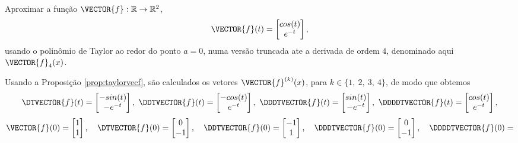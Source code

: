 \begin{example}\label{ex:prop:taylorvecf}
Aproximar a função $\VECTOR{f}:\mathbb{R} \rightarrow \mathbb{R}^{2}$,
\begin{equation}
\VECTOR{f}(t)=
\begin{bmatrix}
cos(t)\\
e^{-t}
\end{bmatrix},
\end{equation}
usando o polinômio de Taylor ao redor do ponto $a=0$,
numa versão truncada ate a derivada de ordem $4$,
denominado aqui $\VECTOR{f}_4(x)$.
\end{example}
\begin{SolutionT}
Usando a Proposição \ref{prop:taylorvecf}, são calculados os vetores $\VECTOR{f}^{(k)}(x)$, para $k\in\{1,~ 2,~ 3,~ 4\}$,
de modo que obtemos
\begin{equation}
\DTVECTOR{f}(t)=
\begin{bmatrix}
-sin(t)\\
-e^{-t}
\end{bmatrix},~
\DDTVECTOR{f}(t)=
\begin{bmatrix}
-cos(t)\\
e^{-t}
\end{bmatrix},~
\DDDTVECTOR{f}(t)=
\begin{bmatrix}
sin(t)\\
-e^{-t}
\end{bmatrix},~
\DDDDTVECTOR{f}(t)=
\begin{bmatrix}
cos(t)\\
e^{-t}
\end{bmatrix},
\end{equation}
\begin{equation}
\VECTOR{f}(0)=
\begin{bmatrix}
1\\
1
\end{bmatrix},
\quad
\DTVECTOR{f}(0)=
\begin{bmatrix}
0\\
-1
\end{bmatrix},
\quad
\DDTVECTOR{f}(0)=
\begin{bmatrix}
-1\\
1
\end{bmatrix},
\quad
\DDDTVECTOR{f}(0)=
\begin{bmatrix}
0\\
-1
\end{bmatrix},
\quad
\DDDDTVECTOR{f}(0)=

\end{equation}
\end{SolutionT}
